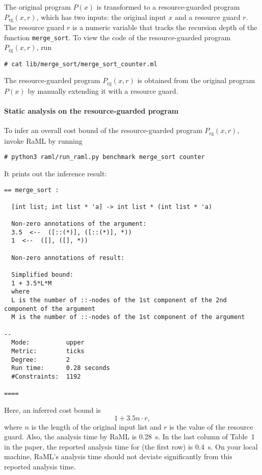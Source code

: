 The original program $P(x)$ is transformed to a resource-guarded program
$P_{\mathrm{rg}}(x, r)$, which has two inputs: the original input $x$ and a
resource guard $r$.
%
The resource guard $r$ is a numeric variable that tracks the recursion depth of
the function \texttt{merge\_sort}.
%
To view the code of the resource-guarded program $P_{\mathrm{rg}}(x, r)$, run
\begin{verbatim}
# cat lib/merge_sort/merge_sort_counter.ml
\end{verbatim}
%
The resource-guarded program $P_{\mathrm{rg}}(x, r)$ is obtained from the
original program $P(x)$ by manually extending it with a resource guard.

\paragraph{Static analysis on the resource-guarded program}

To infer an overall cost bound of the resource-guarded program
$P_{\mathrm{rg}}(x, r)$, invoke RaML by running
\begin{verbatim}
# python3 raml/run_raml.py benchmark merge_sort counter
\end{verbatim}
%
It prints out the inference result:
\begin{Verbatim}[fontsize=\footnotesize]
== merge_sort :

  [int list; int list * 'a] -> int list * (int list * 'a)

  Non-zero annotations of the argument:
  3.5  <--  ([::(*)], ([::(*)], *))
  1  <--  ([], ([], *))

  Non-zero annotations of result:

  Simplified bound:
  1 + 3.5*L*M
  where
  L is the number of ::-nodes of the 1st component of the 2nd component of the argument
  M is the number of ::-nodes of the 1st component of the argument

--
  Mode:          upper
  Metric:        ticks
  Degree:        2
  Run time:      0.28 seconds
  #Constraints:  1192

====
\end{Verbatim}
%
Here, an inferred cost bound is
\begin{equation}
  1 + 3.5 n \cdot r,
\end{equation}
where $n$ is the length of the original input list and $r$ is the value of the
resource guard.
%
Also, the analysis time by RaML is \qty{0.28}{\second}.
%
In the last column of Table~1 in the paper, the reported analysis time for
\mergesort{} (the first row) is \qty{0.4}{\second}.
%
On your local machine, RaML's analysis time should not deviate significantly
from this reported analysis time.

